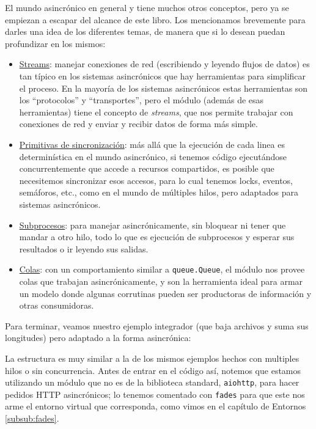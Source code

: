 El mundo asincrónico en general y  tiene muchos otros conceptos, pero ya se empiezan a escapar del alcance de este libro. Los mencionamos brevemente para darles una idea de los diferentes temas, de manera que si lo desean puedan profundizar en los mismos:


\begin{itemize}
    \item \href{https://docs.python.org/dev/library/asyncio-stream.html}{Streams}: manejar conexiones de red (escribiendo y leyendo flujos de datos) es tan típico en los sistemas asincrónicos que hay herramientas para simplificar el proceso. En la mayoría de los sistemas asincrónicos estas herramientas son los ``protocolos'' y ``transportes'', pero el módulo  (además de esas herramientas) tiene el concepto de \textit{streams}, que nos permite trabajar con conexiones de red y enviar y recibir datos de forma más simple.
    \item \href{https://docs.python.org/dev/library/asyncio-sync.html}{Primitivas de sincronización}: más allá que la ejecución de cada linea es determinística en el mundo asincrónico, si tenemos código ejecutándose concurrentemente que accede a recursos compartidos, es posible que necesitemos sincronizar esos accesos, para lo cual tenemos locks, eventos, semáforos, etc., como en el mundo de múltiples hilos, pero adaptados para sistemas asincrónicos.
    \item \href{https://docs.python.org/dev/library/asyncio-subprocess.html}{Subprocesos}: para manejar asincrónicamente, sin bloquear ni tener que mandar a otro hilo, todo lo que es ejecución de subprocesos y esperar sus resultados o ir leyendo sus salidas.
    \item \href{https://docs.python.org/dev/library/asyncio-queue.html}{Colas}: con un comportamiento similar a \texttt{queue.Queue}, el módulo  nos provee colas que trabajan asincrónicamente, y son la herramienta ideal para armar un modelo donde algunas corrutinas pueden ser productoras de información y otras consumidoras.
\end{itemize}


Para terminar, veamos nuestro ejemplo integrador (que baja archivos y suma sus longitudes) pero adaptado a la forma asincrónica:


La estructura es muy similar a la de los mismos ejemplos hechos con multiples hilos o sin concurrencia. Antes de entrar en el código así, notemos que estamos utilizando un módulo que no es de la biblioteca standard, \texttt{aiohttp}, para hacer pedidos HTTP asincrónicos; lo tenemos comentado con \texttt{fades} para que este nos arme el entorno virtual que corresponda, como vimos en el capítulo de Entornos \ref{subsub:fades}.

